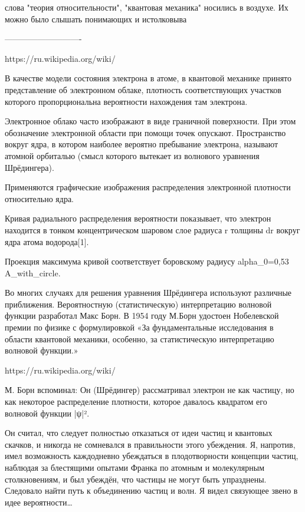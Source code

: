  
слова "теория относительности", "квантовая механика" носились в воздухе. Их можно было слышать  понимающих и истолковыва

----------------------------



https://ru.wikipedia.org/wiki/%
{
В качестве модели состояния электрона в атоме, в квантовой механике принято представление об электронном облаке, плотность соответствующих участков которого пропорциональна вероятности нахождения там электрона.

Электронное облако часто изображают в виде граничной поверхности. При этом обозначение электронной области при помощи точек опускают. Пространство вокруг ядра, в котором наиболее вероятно пребывание электрона, называют атомной орбиталью (смысл которого вытекает из волнового уравнения Шрёдингера).

Применяются графические изображения распределения электронной плотности относительно ядра.

Кривая радиального распределения вероятности показывает, что электрон находится в тонком концентрическом шаровом слое радиуса r толщины dr вокруг ядра атома водорода[1].

Проекция максимума кривой соответствует боровскому радиусу alpha_0=0,53 A_with_circle.

Во многих случаях для решения уравнения Шрёдингера используют различные приближения. Вероятностную (статистическую) интерпретацию волновой функции разработал Макс Борн. В 1954 году М.Борн удостоен Нобелевской премии по физике с формулировкой «За фундаментальные исследования в области квантовой механики, особенно, за статистическую интерпретацию волновой функции.»
}

https://ru.wikipedia.org/wiki/%
{
М. Борн вспоминал:
Он (Шрёдингер) рассматривал электрон не как частицу, но как некоторое распределение плотности, которое давалось квадратом его волновой функции |ψ|².

Он считал, что следует полностью отказаться от идеи частиц и квантовых скачков, и никогда не сомневался в правильности этого убеждения. Я, напротив, имел возможность каждодневно убеждаться в плодотворности концепции частиц, наблюдая за блестящими опытами Франка по атомным и молекулярным столкновениям, и был убеждён, что частицы не могут быть упразднены. Следовало найти путь к объединению частиц и волн. Я видел связующее звено в идее вероятности…
}


